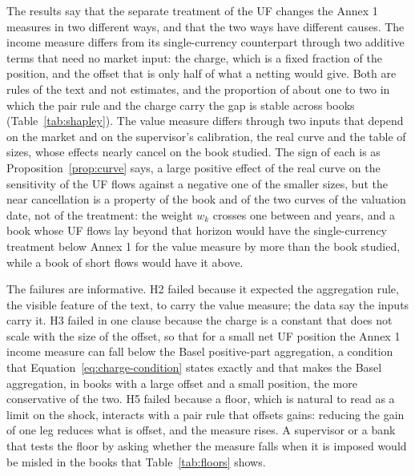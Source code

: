 The results say that the separate treatment of the UF changes the Annex 1 measures in two different ways, and that the two ways have different causes. The income measure differs from its single-currency counterpart through two additive terms that need no market input: the charge, which is a fixed fraction of the position, and the offset that is only half of what a netting would give. Both are rules of the text and not estimates, and the proportion of about one to two in which the pair rule and the charge carry the gap is stable across books (Table~\ref{tab:shapley}). The value measure differs through two inputs that depend on the market and on the supervisor's calibration, the real curve and the table of sizes, whose effects nearly cancel on the book studied. The sign of each is as Proposition~\ref{prop:curve} says, a large positive effect of the real curve on the sensitivity of the UF flows against a negative one of the smaller sizes, but the near cancellation is a property of the book and of the two curves of the valuation date, not of the treatment: the weight $w_k$ crosses one between \tStarLo{} and \tStarHi{} years, and a book whose UF flows lay beyond that horizon would have the single-currency treatment below Annex 1 for the value measure by more than the book studied, while a book of short flows would have it above.

The failures are informative. H2 failed because it expected the aggregation rule, the visible feature of the text, to carry the value measure; the data say the inputs carry it. H3 failed in one clause because the charge is a constant that does not scale with the size of the offset, so that for a small net UF position the Annex 1 income measure can fall below the Basel positive-part aggregation, a condition that Equation~\eqref{eq:charge-condition} states exactly and that makes the Basel aggregation, in books with a large offset and a small position, the more conservative of the two. H5 failed because a floor, which is natural to read as a limit on the shock, interacts with a pair rule that offsets gains: reducing the gain of one leg reduces what is offset, and the measure rises. A supervisor or a bank that tests the floor by asking whether the measure falls when it is imposed would be misled in the books that Table~\ref{tab:floors} shows.

